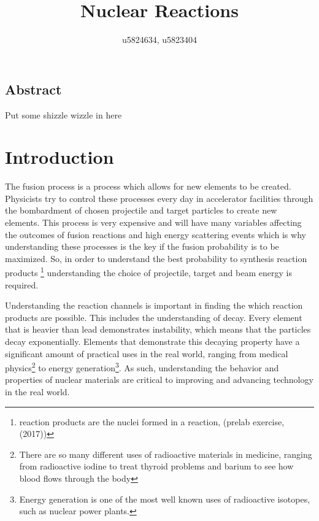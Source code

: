 \documentclass{article}
\begin{document}
\title{Nuclear Reactions}
\author{u5824634, u5823404}
\maketitle
\begin{center}
\section*{Abstract}
Put some shizzle wizzle in here
\end{center}
\newpage
\section{Introduction}
The fusion process is a process which allows for new elements to be created. Physicists try to control these processes every day in accelerator facilities through the bombardment of chosen projectile and target particles to create new elements. This process is very expensive and will have many variables affecting the outcomes of fusion reactions and high energy scattering events which is why understanding these processes is the key if the fusion probability is to be maximized. So, in order to understand the best probability to synthesis reaction products \footnote{reaction products are the nuclei formed in a reaction, (prelab exercise, (2017))} understanding the choice of projectile, target and beam energy is required. 

Understanding the reaction channels is important in finding the which reaction products are possible. This includes the understanding of decay. Every element that is heavier than lead demonstrates instability, which means that the particles decay exponentially. Elements that demonstrate this decaying property have a significant amount of practical uses in the real world, ranging from medical physics\footnote{There are so many different uses of radioactive materials in medicine, ranging from radioactive iodine to treat thyroid problems and barium to see how blood flows through the body} to energy generation\footnote{Energy generation is one of the most well known uses of radioactive isotopes, such as nuclear power plants.}. As such, understanding the behavior and properties of nuclear materials are critical to improving and advancing technology in the real world. 
\end{document}
